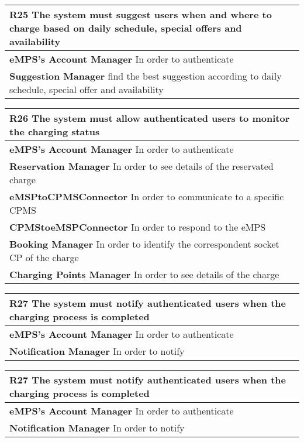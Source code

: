 \begin{table}[H]
    \begin{tabularx}{\textwidth}{X}
        \toprule
        \textbf{R25} The system must suggest users when and where to charge based on daily
        schedule, special offers and availability \\ \midrule
        \textbf{eMPS's Account Manager} In order to authenticate\\  
        \textbf{Suggestion Manager} find the best suggestion according to daily schedule, special offer and availability\\
    \end{tabularx}
\end{table}
\begin{table}[H]
    \begin{tabularx}{\textwidth}{X}
        \toprule
        \textbf{R26} The system must allow authenticated users to monitor the charging status        \\ \midrule
        \textbf{eMPS's Account Manager} In order to authenticate\\  
        \textbf{Reservation Manager} In order to see details of the reservated charge  \\ 
        \textbf{eMSPtoCPMSConnector} In order to communicate to a specific CPMS \\ 
        \textbf{CPMStoeMSPConnector} In order to respond to the eMPS \\
        \textbf{Booking Manager} In order to identify the correspondent socket CP of the charge\\               
        \textbf{Charging Points Manager} In order to see details of the charge \\
    \end{tabularx}
\end{table}
\begin{table}[H]
    \begin{tabularx}{\textwidth}{X}
        \toprule
        \textbf{R27} The system must notify authenticated users when the charging process is completed                \\ \midrule
        \textbf{eMPS's Account Manager} In order to authenticate\\  
        \textbf{Notification Manager} In order to notify\\
    \end{tabularx}
\end{table}
\begin{table}[H]
    \begin{tabularx}{\textwidth}{X}
        \toprule
        \textbf{R27} The system must notify authenticated users when the charging process is completed                \\ \midrule
        \textbf{eMPS's Account Manager} In order to authenticate\\  
        \textbf{Notification Manager} In order to notify\\
    \end{tabularx}
\end{table}
